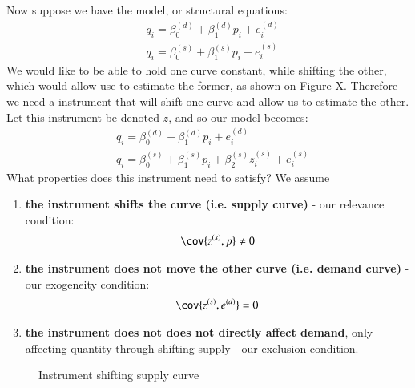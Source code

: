             Now suppose we have the model, or structural equations:
            \begin{align}
                &q_i =\beta_0^{(d)}+\beta_1^{(d)}p_i+e_i^{(d)}\\
                &q_i =\beta_0^{(s)}+\beta_1^{(s)}p_i+e_i^{(s)}
            \end{align}
            We would like to be able to hold one curve constant, while shifting the other, which would allow use to estimate the former, as shown on Figure X. Therefore we need a instrument that will shift one curve and allow us to estimate the other. Let this instrument be denoted $z$, and so our model becomes:
            \begin{align}
                &q_i =\beta_0^{(d)} + \beta_1^{(d)}p_i + e_i^{(d)}\label{eq:endogeneity/demand}\\
                &q_i =\beta_0^{(s)} + \beta_1^{(s)}p_i + \beta_2^{(s)}z^{(s)}_i + e_i^{(s)}\label{eq:endogeneity/supply_w_IV}
            \end{align}
            What properties does this instrument need to satisfy? We assume
            \begin{enumerate}
                \item \textbf{the instrument shifts the curve (i.e. supply curve)} - our relevance condition:
                \begin{align}
                    \cov{z^{(s)}, p} \neq 0
                \end{align}
                
                \item \textbf{the instrument does not move the other curve (i.e. demand curve)} - our exogeneity condition:
                \begin{align}
                    \cov{z^{(s)},e^{(d)}} = 0
                \end{align}
                
                \item \textbf{the instrument does not does not directly affect demand}, only affecting quantity through shifting supply - our exclusion condition.
            \end{enumerate}
            \begin{figure}
                \centering
                
                \caption{Instrument shifting supply curve}
                \label{fig:endogeneity/sem/iv}
            \end{figure}
            

